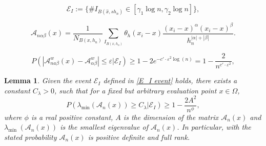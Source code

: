 \documentclass[10pt,a4paper]{amsart}
\newtheorem{lemma}{Lemma}
\begin{document}
\begin{equation}
    \mathscr{E}_I:=\{ \# I_{B(\hat{x}, s h_n)} \in [\gamma_1 \log n,\gamma_2 \log n] \},
\label{E_I event}
\end{equation}

\begin{equation}
    \mathscr{A}_{n \alpha \beta}(x) =\frac{1}{N_{B\left(x, h_n\right)}} \sum_{I_{B\left(x, h_n\right)}} \theta_h(x_i-x)\frac{\left(x_i-x\right)^\alpha\left(x_i-x\right)^\beta}{h_n^{|\alpha|+|\beta|}}. 
    \label{Anab}
\end{equation}

\begin{equation}
    P\left(\left|\mathscr{A}_{n a \beta}^w(x)-\mathscr{A}^w_{\alpha \beta}\right| \leq \varepsilon \Big|  \mathscr{E}_I\right)\geq 1-2 e^{-c'\cdot \varepsilon^2 \log(n) }=1-\frac{2}{n^{c'\cdot \varepsilon^2 }},
    \label{eq:bernstein inequality}
\end{equation}

\begin{lemma} 
Given the event $\mathscr{E}_I$ defined in \eqref{E_I event} holds, there exists a constant $C_\lambda>0$,  such that for a fixed but arbitrary evaluation point $x\in \Omega$,
$$
P\left(\lambda_{\min }\left(\mathscr{A}_n(x)\right) \geq C_\lambda \Big| \mathscr{E}_I\right)\geq 1-\frac{2A^2}{n^\phi},
$$
where $\phi$ is a real positive constant, $A$ is the dimension of the matrix $\mathscr{A}_n(x)$ and $\lambda_{\text {min }}\left(\mathscr{A}_n(x)\right)$ is the smallest eigenvalue of $\mathscr{A}_n(x)$. In particular, with the stated probability $\mathscr{A}_n(x)$ is positive definite and full rank.
    \label{lemma 3.7 davoud - lambda_min}
\end{lemma}
\end{document}
